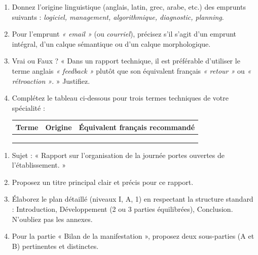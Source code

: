 \documentclass[11pt]{article}
\begin{document}
\begin{exercice}
\begin{enumerate}
    \item Donnez l'origine linguistique (anglais, latin, grec, arabe, etc.) des emprunts suivants : \textit{logiciel, management, algorithmique, diagnostic, planning}.
    \item Pour l'emprunt \textit{« email »} (ou \textit{courriel}), précisez s'il s'agit d'un emprunt intégral, d'un calque sémantique ou d'un calque morphologique.
    \item Vrai ou Faux ? « Dans un rapport technique, il est préférable d'utiliser le terme anglais \textit{« feedback »} plutôt que son équivalent français \textit{« retour »} ou \textit{« rétroaction »}. » Justifiez.
    \item Complétez le tableau ci-dessous pour trois termes techniques de votre spécialité :
    \begin{tabular}{|l|c|c|}
    \hline
    \textbf{Terme} & \textbf{Origine} & \textbf{Équivalent français recommandé} \\ \hline
     &  &  \\ \hline
     &  &  \\ \hline
     &  &  \\ \hline
    \end{tabular}
\end{enumerate}
\end{exercice}

\begin{exercice}
\begin{enumerate}
    \item Sujet : « Rapport sur l'organisation de la journée portes ouvertes de l'établissement. »
    \item Proposez un titre principal clair et précis pour ce rapport.
    \item Élaborez le plan détaillé (niveaux I, A, 1) en respectant la structure standard : Introduction, Développement (2 ou 3 parties équilibrées), Conclusion. N'oubliez pas les annexes.
    \item Pour la partie « Bilan de la manifestation », proposez deux sous-parties (A et B) pertinentes et distinctes.
\end{enumerate}
\end{exercice}
\end{document}
